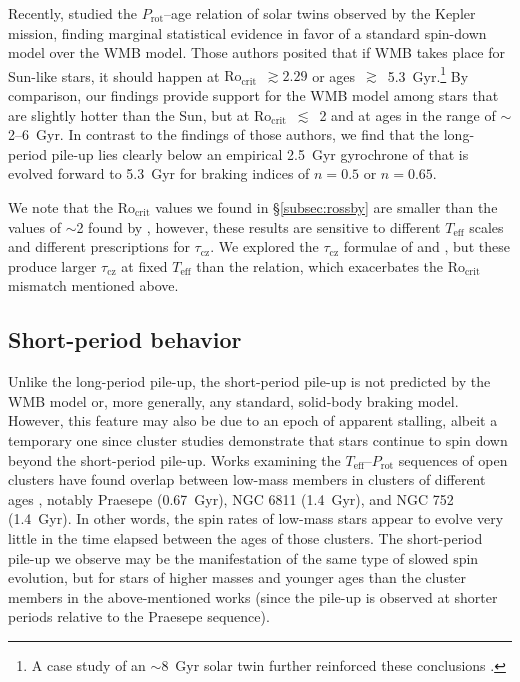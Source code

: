 \documentclass[linenumbers,trackchanges,twocolumn]{aastex631}
\newcommand{\taucz}{$\tau_\mathrm{cz}$\xspace}
\newcommand{\rocrit}{$\mathrm{Ro_{crit}}$\xspace}
\newcommand{\teff}{\ensuremath{T_{\mathrm{eff}}}\xspace}
\newcommand{\prot}{\ensuremath{P_\mathrm{rot}}\xspace}
\begin{document}
Recently, \citet{LorenzoOliveira2019} studied the \prot--age relation of solar twins observed by the Kepler mission, finding marginal statistical evidence in favor of a standard spin-down model over the WMB model. Those authors posited that if WMB takes place for Sun-like stars, it should happen at \rocrit~$\gtrsim 2.29$ or ages~$\gtrsim$~5.3~Gyr.\footnote{A case study of an $\sim$8~Gyr solar twin further reinforced these conclusions \citep{LorenzoOliveira2020}.} By comparison, our findings provide support for the WMB model among stars that are slightly hotter than the Sun, but at \rocrit~$\lesssim$~2 and at ages in the range of $\sim$2--6~Gyr. In contrast to the findings of those authors, we find that the long-period pile-up lies clearly below an empirical 2.5~Gyr gyrochrone of \citet{Curtis2020} that is evolved forward to 5.3~Gyr for braking indices of $n=0.5$ or $n=0.65$. 

We note that the \rocrit values we found in \S\ref{subsec:rossby} are smaller than the values of $\sim$2 found by \citet{vanSaders2016,vanSaders2019}, however, these results are sensitive to different \teff scales and different prescriptions for \taucz. We explored the \taucz formulae of \citet{BarnesKim2010} and \citet{Landin2010}, but these produce larger \taucz at fixed \teff than the \citet{Gunn1998} relation, which exacerbates the \rocrit mismatch mentioned above.


\subsection{Short-period behavior} \label{subsec:shortperiod}

Unlike the long-period pile-up, the short-period pile-up is not predicted by the WMB model or, more generally, any standard, solid-body braking model. However, this feature may also be due to an epoch of apparent stalling, albeit a temporary one since cluster studies demonstrate that stars continue to spin down beyond the short-period pile-up. Works examining the \teff–\prot sequences of open clusters have found overlap between low-mass members in clusters of different ages \citep{Agueros2018, Curtis2019a, Curtis2020}, notably Praesepe (0.67~Gyr), NGC 6811 (1.4~Gyr), and NGC 752 (1.4~Gyr). In other words, the spin rates of low-mass stars appear to evolve very little in the time elapsed between the ages of those clusters. The short-period pile-up we observe may be the manifestation of the same type of slowed spin evolution, but for stars of higher masses and younger ages than the cluster members in the above-mentioned works (since the pile-up is observed at shorter periods relative to the Praesepe sequence). 
\end{document}
